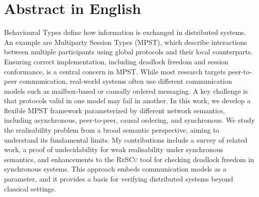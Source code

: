 \documentclass[12pt,a4paper,twoside]{book}
\theoremstyle{definition}
\theoremstyle{definition}
\theoremstyle{definition}
\begin{document}
\chapter*{Abstract in English}
Behavioural Types define how information is exchanged in distributed systems.
An example are Multiparty Session Types (MPST), which describe interactions between 
multiple participants
using global protocols and their local counterparts. Ensuring correct implementation,
including deadlock freedom and session conformance, is a central concern in MPST.
While most research targets peer-to-peer communication, real-world systems often
use different communication models such as mailbox-based or causally ordered messaging.
A key challenge is that protocols valid in one model may fail in another.
In this work, we develop a flexible MPST framework parameterized by different network
semantics, including asynchronous, peer-to-peer, causal ordering, and synchronous.
We study the realisability problem from a broad semantic perspective, aiming to
understand its fundamental limits. My contributions include a survey
of related work, a proof of undecidability for weak realisability under synchronous
semantics, and enhancements to the \textsc{ReSCu} tool for checking deadlock freedom in
synchronous systems. This approach embeds communication models as a parameter, and it
provides a basis for verifying distributed systems beyond classical settings.

\thispagestyle{plain}
\topmargin=-1cm
\cleardoublepage
{}
{}
\tableofcontents
\thispagestyle{empty}
\cleardoublepage
{}
{}
\listoftables
\thispagestyle{empty}
\cleardoublepage
{}
{}
\listoffigures
\thispagestyle{empty}
\cleardoublepage
{}
{}
\lstlistoflistings
\thispagestyle{empty}
\newpage~\newpage

\raggedbottom



% 











\newpage

{}



% 

\newpage


\end{document}
